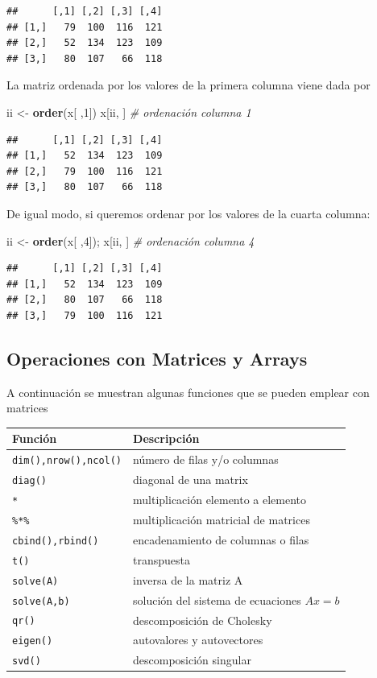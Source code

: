 \documentclass[]{book}
\newenvironment{Shaded}{\begin{snugshade}}{\end{snugshade}}
\newcommand{\CommentTok}[1]{\textcolor[rgb]{0.56,0.35,0.01}{\textit{#1}}}
\newcommand{\DecValTok}[1]{\textcolor[rgb]{0.00,0.00,0.81}{#1}}
\newcommand{\KeywordTok}[1]{\textcolor[rgb]{0.13,0.29,0.53}{\textbf{#1}}}
\newcommand{\NormalTok}[1]{#1}
\newcommand{\StringTok}[1]{\textcolor[rgb]{0.31,0.60,0.02}{#1}}
\begin{document}
\begin{verbatim}
##      [,1] [,2] [,3] [,4]
## [1,]   79  100  116  121
## [2,]   52  134  123  109
## [3,]   80  107   66  118
\end{verbatim}

La matriz ordenada por los valores de la primera columna viene dada por

\begin{Shaded}
\begin{Highlighting}[]
\NormalTok{ii <-}\StringTok{ }\KeywordTok{order}\NormalTok{(x[ ,}\DecValTok{1}\NormalTok{])}
\NormalTok{x[ii, ]  }\CommentTok{# ordenación columna 1}
\end{Highlighting}
\end{Shaded}

\begin{verbatim}
##      [,1] [,2] [,3] [,4]
## [1,]   52  134  123  109
## [2,]   79  100  116  121
## [3,]   80  107   66  118
\end{verbatim}

De igual modo, si queremos ordenar por los valores de la cuarta columna:

\begin{Shaded}
\begin{Highlighting}[]
\NormalTok{ii <-}\StringTok{ }\KeywordTok{order}\NormalTok{(x[ ,}\DecValTok{4}\NormalTok{]); x[ii, ]  }\CommentTok{# ordenación columna 4}
\end{Highlighting}
\end{Shaded}

\begin{verbatim}
##      [,1] [,2] [,3] [,4]
## [1,]   52  134  123  109
## [2,]   80  107   66  118
## [3,]   79  100  116  121
\end{verbatim}

\hypertarget{operaciones-con-matrices-y-arrays}{%
\subsection{Operaciones con Matrices y Arrays}\label{operaciones-con-matrices-y-arrays}}

A continuación se muestran algunas funciones que se pueden emplear con
matrices

\begin{longtable}[]{@{}ll@{}}
\toprule
Función & Descripción\tabularnewline
\midrule
\endhead
\texttt{dim(),nrow(),ncol()} & número de filas y/o columnas\tabularnewline
\texttt{diag()} & diagonal de una matrix\tabularnewline
\texttt{*} & multiplicación elemento a elemento\tabularnewline
\texttt{\%*\%} & multiplicación matricial de matrices\tabularnewline
\texttt{cbind(),rbind()} & encadenamiento de columnas o filas\tabularnewline
\texttt{t()} & transpuesta\tabularnewline
\texttt{solve(A)} & inversa de la matriz A\tabularnewline
\texttt{solve(A,b)} & solución del sistema de ecuaciones \(Ax=b\)\tabularnewline
\texttt{qr()} & descomposición de Cholesky\tabularnewline
\texttt{eigen()} & autovalores y autovectores\tabularnewline
\texttt{svd()} & descomposición singular\tabularnewline
\bottomrule
\end{longtable}
\end{document}
